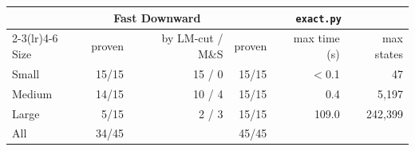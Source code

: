 \begin{tabular}{lrrrrr}
\toprule
 & \multicolumn{2}{c}{Fast Downward} & \multicolumn{3}{c}{\texttt{exact.py}} \\
\cmidrule(lr){2-3}\cmidrule(lr){4-6}
Size & proven & by LM-cut / M\&S & proven & max time (s) & max states \\
\midrule
Small & 15/15 & 15 / 0 & 15/15 & $<$0.1 & 47 \\
Medium & 14/15 & 10 / 4 & 15/15 & 0.4 & 5{,}197 \\
Large & 5/15 & 2 / 3 & 15/15 & 109.0 & 242{,}399 \\
\midrule
All & 34/45 & & 45/45 & & \\
\bottomrule
\end{tabular}
